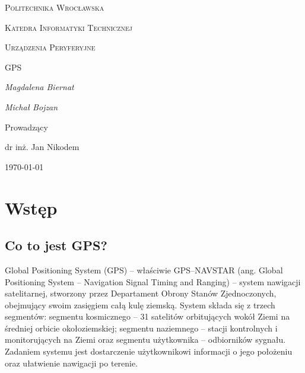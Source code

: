 \documentclass[12pt]{article}
\begin{document}
	
	\begin{titlepage}
		\centering
		{\scshape\LARGE Politechnika Wrocławska \par}
		{\scshape\Large Katedra Informatyki Technicznej\par}
		
		\vspace{1.5cm}
		{\scshape\Large Urządzenia Peryferyjne \par}
		\vspace{1.5cm}
		{\scshape\Huge GPS}
		\vspace{1.5cm}
	
		\vspace{2cm}
		{\Large\itshape Magdalena Biernat\par}
		{\Large\itshape Michał Bojzan \par}
		\vfill\flushleft\large
	
		
		\normalsize	\centering	\vspace{3cm}
		Prowadzący\par
		dr inż. Jan Nikodem 

		\vfill
		{\large \today\par}
	\end{titlepage}

	\newpage
\section{Wstęp}
\subsection{Co to jest GPS?}
Global Positioning System (GPS) – właściwie GPS–NAVSTAR (ang. Global Positioning System – Navigation Signal Timing and Ranging) – system nawigacji satelitarnej, stworzony przez Departament Obrony Stanów Zjednoczonych, obejmujący swoim zasięgiem całą kulę ziemską. System składa się z trzech segmentów: segmentu kosmicznego – 31 satelitów orbitujących wokół Ziemi na średniej orbicie okołoziemskiej; segmentu naziemnego – stacji kontrolnych i monitorujących na Ziemi oraz segmentu użytkownika – odbiorników sygnału. Zadaniem systemu jest dostarczenie użytkownikowi informacji o jego położeniu oraz ułatwienie nawigacji po terenie.
\end{document}

